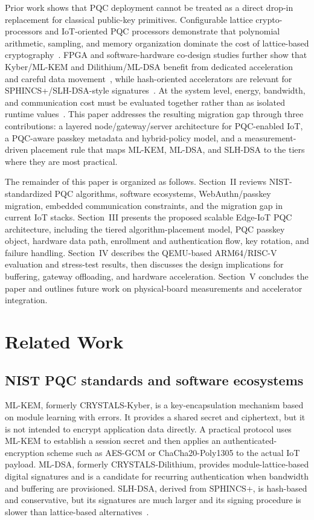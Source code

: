 \documentclass[conference,10pt,letterpaper]{IEEEtran}
\begin{document}
Prior work shows that PQC deployment cannot be treated as a direct drop-in replacement for classical public-key primitives. Configurable lattice crypto-processors and IoT-oriented PQC processors demonstrate that polynomial arithmetic, sampling, and memory organization dominate the cost of lattice-based cryptography~\cite{banerjee2019,ye2024}. FPGA and software-hardware co-design studies further show that Kyber/ML-KEM and Dilithium/ML-DSA benefit from dedicated acceleration and careful data movement~\cite{carril2024,mao2023}, while hash-oriented accelerators are relevant for SPHINCS+/SLH-DSA-style signatures~\cite{karl2025}. At the system level, energy, bandwidth, and communication cost must be evaluated together rather than as isolated runtime values~\cite{roma2021,liu2018,schoeffel2021}. This paper addresses the resulting migration gap through three contributions: a layered node/gateway/server architecture for PQC-enabled IoT, a PQC-aware passkey metadata and hybrid-policy model, and a measurement-driven placement rule that maps ML-KEM, ML-DSA, and SLH-DSA to the tiers where they are most practical.

The remainder of this paper is organized as follows. Section~II reviews NIST-standardized PQC algorithms, software ecosystems, WebAuthn/passkey migration, embedded communication constraints, and the migration gap in current IoT stacks. Section~III presents the proposed scalable Edge-IoT PQC architecture, including the tiered algorithm-placement model, PQC passkey object, hardware data path, enrollment and authentication flow, key rotation, and failure handling. Section~IV describes the QEMU-based ARM64/RISC-V evaluation and stress-test results, then discusses the design implications for buffering, gateway offloading, and hardware acceleration. Section~V concludes the paper and outlines future work on physical-board measurements and accelerator integration.

\section{Related Work}

\subsection{NIST PQC standards and software ecosystems}

ML-KEM, formerly CRYSTALS-Kyber, is a key-encapsulation mechanism based on module learning with errors. It provides a shared secret and ciphertext, but it is not intended to encrypt application data directly. A practical protocol uses ML-KEM to establish a session secret and then applies an authenticated-encryption scheme such as AES-GCM or ChaCha20-Poly1305 to the actual IoT payload. ML-DSA, formerly CRYSTALS-Dilithium, provides module-lattice-based digital signatures and is a candidate for recurring authentication when bandwidth and buffering are provisioned. SLH-DSA, derived from SPHINCS+, is hash-based and conservative, but its signatures are much larger and its signing procedure is slower than lattice-based alternatives~\cite{fips203,fips204,fips205}.
\end{document}
